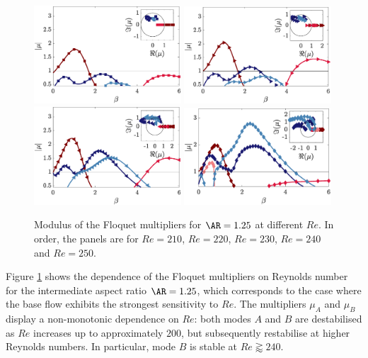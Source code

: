 \begin{figure}
  \centering
  \includegraphics[width=0.49\textwidth]{./fig/AR1p25/mu_beta_Re210.eps}
  \includegraphics[width=0.49\textwidth]{./fig/AR1p25/mu_beta_Re220.eps}
  \includegraphics[width=0.49\textwidth]{./fig/AR1p25/mu_beta_Re230.eps}
  \includegraphics[width=0.49\textwidth]{./fig/AR1p25/mu_beta_Re240.eps}
  \caption{Modulus of the Floquet multipliers for $\AR=1.25$ at different $Re$. In order, the panels are for $Re=210$, $Re=220$, $Re=230$, $Re=240$ and $Re=250$.}
  \label{fig:mult-AR1p25}
\end{figure}
%
Figure \ref{fig:mult-AR1p25} shows the dependence of the Floquet multipliers on Reynolds number for the intermediate aspect ratio $\AR=1.25$, which corresponds to the case where the base flow exhibits the strongest sensitivity to $Re$. The multipliers $\mu_A$ and $\mu_B$ display a non-monotonic dependence on $Re$: both modes $A$ and $B$ are destabilised as $Re$ increases up to approximately $200$, but subsequently restabilise at higher Reynolds numbers. In particular, mode $B$ is stable at $Re \gtrapprox 240$.

